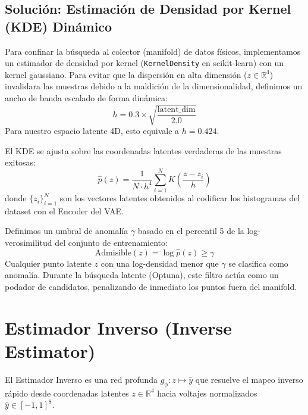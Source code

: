 \documentclass[12pt,letterpaper]{article}
\begin{document}
\subsection{Solución: Estimación de Densidad por Kernel (KDE) Dinámico}
Para confinar la búsqueda al colector (manifold) de datos físicos, implementamos un estimador de densidad por kernel (\texttt{KernelDensity} en scikit-learn) con un kernel gaussiano. Para evitar que la dispersión en alta dimensión ($z \in \mathbb{R}^4$) invalidara las muestras debido a la maldición de la dimensionalidad, definimos un ancho de banda escalado de forma dinámica:
\begin{equation}
    h = 0.3 \times \sqrt{\frac{\text{latent\_dim}}{2.0}}
\end{equation}
Para nuestro espacio latente 4D, esto equivale a $h = 0.424$.

El KDE se ajusta sobre las coordenadas latentes verdaderas de las muestras exitosas:
\begin{equation}
    \hat{p}(z) = \frac{1}{N \cdot h^4} \sum_{i=1}^{N} K\left( \frac{z - z_i}{h} \right)
\end{equation}
donde $\{z_i\}_{i=1}^N$ son los vectores latentes obtenidos al codificar los histogramas del dataset con el Encoder del VAE.

Definimos un umbral de anomalía $\gamma$ basado en el percentil 5 de la log-verosimilitud del conjunto de entrenamiento:
\begin{equation}
    \text{Admisible}(z) = \log \hat{p}(z) \geq \gamma
\end{equation}
Cualquier punto latente $z$ con una log-densidad menor que $\gamma$ se clasifica como anomalía. Durante la búsqueda latente (Optuna), este filtro actúa como un podador de candidatos, penalizando de inmediato los puntos fuera del manifold.

\section{Estimador Inverso (Inverse Estimator)}
El Estimador Inverso es una red profunda $g_\phi: z \mapsto \hat{y}$ que resuelve el mapeo inverso rápido desde coordenadas latentes $z \in \mathbb{R}^4$ hacia voltajes normalizados $\hat{y} \in [-1, 1]^8$.
\end{document}
